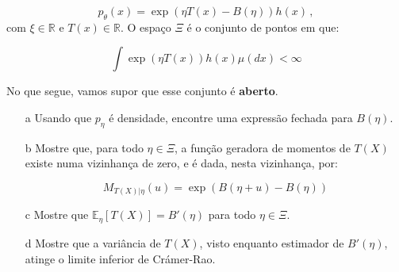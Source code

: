 \documentclass[10pt,a4paper]{article}
\begin{document}
 $$p_\theta(x) = \exp(\eta T(x) - B(\eta)) h(x)\, ,$$
 com $\xi \in \mathbb{R}$ e $T(x) \in \mathbb{R}$. O espaço $\Xi$ é o conjunto de pontos em que: 
 
 $$\int \exp(\eta T(x)) h(x) \mu(dx) < \infty$$
 
 No que segue, vamos supor que esse conjunto é \textbf{aberto}.
 
 \begin{itemize}
 	\item[a]Usando que $p_\eta$ é densidade,  encontre uma expressão fechada para $B(\eta)$.
 	\item[b] Mostre que, para todo $\eta \in \Xi$, a função geradora de momentos de $T(X)$ existe numa vizinhança de zero, e é dada, nesta vizinhança, por:
 	
 	$$M_{T(X)|\eta}(u) =  \exp(B(\eta+u) - B(\eta))$$
 	
 	\item[c] Mostre que $\mathbb{E}_\eta[T(X)] = B'(\eta)$ para todo $\eta \in \Xi$.
 	\item[d] Mostre que a variância de $T(X)$, visto enquanto estimador de  $B'(\eta)$, atinge o limite inferior de Crámer-Rao.
 \end{itemize}
\end{document}
